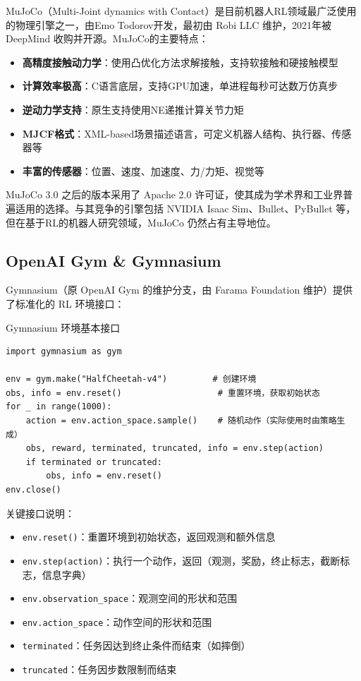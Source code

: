MuJoCo（Multi-Joint dynamics with Contact）是目前机器人RL领域最广泛使用的物理引擎之一，由Emo Todorov开发，最初由 Robi LLC 维护，2021年被 DeepMind 收购并开源。MuJoCo的主要特点：

\begin{itemize}
    \item \textbf{高精度接触动力学}：使用凸优化方法求解接触，支持软接触和硬接触模型
    \item \textbf{计算效率极高}：C语言底层，支持GPU加速，单进程每秒可达数万仿真步
    \item \textbf{逆动力学支持}：原生支持使用NE递推计算关节力矩
    \item \textbf{MJCF格式}：XML-based场景描述语言，可定义机器人结构、执行器、传感器等
    \item \textbf{丰富的传感器}：位置、速度、加速度、力/力矩、视觉等
\end{itemize}

\begin{remark}
MuJoCo 3.0 之后的版本采用了 Apache 2.0 许可证，使其成为学术界和工业界普遍适用的选择。与其竞争的引擎包括 NVIDIA Isaac Sim、Bullet、PyBullet 等，但在基于RL的机器人研究领域，MuJoCo 仍然占有主导地位。
\end{remark}

\subsection{OpenAI Gym \& Gymnasium}

Gymnasium（原 OpenAI Gym 的维护分支，由 Farama Foundation 维护）提供了标准化的 RL 环境接口：

\begin{myalgorithm}{Gymnasium 环境基本接口}
\begin{verbatim}
import gymnasium as gym

env = gym.make("HalfCheetah-v4")         # 创建环境
obs, info = env.reset()                   # 重置环境，获取初始状态
for _ in range(1000):
    action = env.action_space.sample()    # 随机动作（实际使用时由策略生成）
    obs, reward, terminated, truncated, info = env.step(action)
    if terminated or truncated:
        obs, info = env.reset()
env.close()
\end{verbatim}
\end{myalgorithm}

关键接口说明：
\begin{itemize}
    \item \texttt{env.reset()}：重置环境到初始状态，返回观测和额外信息
    \item \texttt{env.step(action)}：执行一个动作，返回（观测，奖励，终止标志，截断标志，信息字典）
    \item \texttt{env.observation\_space}：观测空间的形状和范围
    \item \texttt{env.action\_space}：动作空间的形状和范围
    \item \texttt{terminated}：任务因达到终止条件而结束（如摔倒）
    \item \texttt{truncated}：任务因步数限制而结束
\end{itemize}

